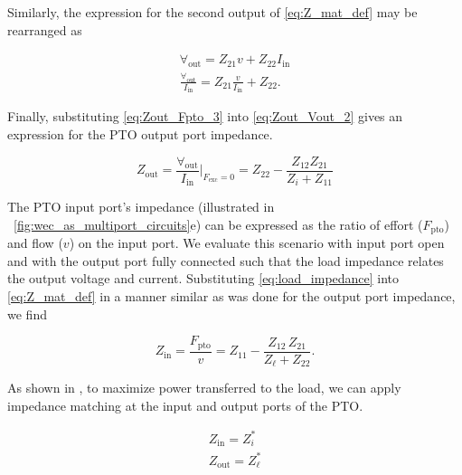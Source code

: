 \documentclass[lettersize,journal]{IEEEtran}
\begin{document}
\noindent{}Similarly, the expression for the second output of \eqref{eq:Z_mat_def} may be rearranged as

\begin{subequations}
        \begin{align}
                \forall_{\textrm{out}} = Z_{21} v + Z_{22} I_{\textrm{in}} \label{eq:Zout_Vout_1} \\[0.5em]
                \frac{\forall_{\textrm{out}}}{I_{\textrm{in}}} = Z_{21} \frac{v}{I_{\textrm{in}}} + Z_{22} . \label{eq:Zout_Vout_2}
        \end{align} 
        \label{eq:Zout_Vout}
\end{subequations}

\noindent{}Finally, substituting \eqref{eq:Zout_Fpto_3} into \eqref{eq:Zout_Vout_2} gives an expression for the PTO output port impedance.

\begin{equation}
        Z_{\textrm{out}} = \frac{\forall_{\textrm{out}}}{I_{\textrm{in}}} \bigg\vert_{F_{\textrm{exc}}=0} = Z_{22} - \frac{Z_{12} Z_{21}}{Z_{i} + Z_{11}}
        \label{eq:pto_output_port_impedance}
\end{equation}

The PTO input port's impedance (illustrated in \figurename~\ref{fig:wec_as_multiport_circuits}e) can be expressed as the ratio of effort ($F_{\textrm{pto}}$) and flow ($v$) on the input port.
We evaluate this scenario with input port open and with the output port fully connected such that the load impedance relates the output voltage and current.
Substituting \eqref{eq:load_impedance} into \eqref{eq:Z_mat_def} in a manner similar as was done for the output port impedance, we find

\begin{equation}
        Z_{\textrm{in}} = \frac{F_{\textrm{pto}}}{v}=  Z_{11} - \frac{Z_{12} \, Z_{21}}{Z_\ell + Z_{22}} .
        \label{eq:pto_input_port_impedance}
\end{equation}

As shown in  \cite{Bacelli:2021aa}, to maximize power transferred to the load, we can apply impedance matching at the input and output ports of the PTO.

\begin{subequations}
    \begin{align}
        Z_{\textrm{in}} = Z_i^*  \label{eq:bi_conj_matching_in} \\ 
        Z_{\textrm{out}} = Z_\ell^* \label{eq:bi_conj_matching_out}
    \end{align}
\label{eq:bi_conj_matching}
\end{subequations}
\end{document}
